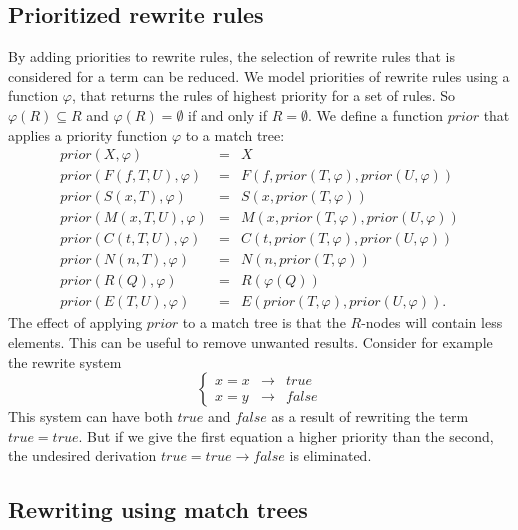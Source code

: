 \documentclass{article}
\begin{document}
\subsection{Prioritized rewrite rules}

By adding priorities to rewrite rules, the selection of rewrite rules that
is considered for a term can be reduced. We model priorities of rewrite
rules using a function $\varphi $, that returns the rules of highest
priority for a set of rules. So $\varphi (R)\subseteq R$ and $\varphi
(R)=\emptyset $ if and only if $R=\emptyset $. We define a function $prior$
that applies a priority function $\varphi $ to a match tree:%
\begin{equation*}
\begin{array}{lll}
prior(X,\varphi ) & = & X \\ 
prior(F(f,T,U),\varphi ) & = & F(f,prior(T,\varphi ),prior(U,\varphi )) \\ 
prior(S(x,T),\varphi ) & = & S(x,prior(T,\varphi )) \\ 
prior(M(x,T,U),\varphi ) & = & M(x,prior(T,\varphi ),prior(U,\varphi )) \\ 
prior(C(t,T,U),\varphi ) & = & C(t,prior(T,\varphi ),prior(U,\varphi )) \\ 
prior(N(n,T),\varphi ) & = & N(n,prior(T,\varphi )) \\ 
prior(R(Q),\varphi ) & = & R(\varphi (Q)) \\ 
prior(E(T,U),\varphi ) & = & E(prior(T,\varphi ),prior(U,\varphi )).%
\end{array}%
\end{equation*}%
The effect of applying $prior$ to a match tree is that the $R$-nodes will
contain less elements. This can be useful to remove unwanted results.
Consider for example the rewrite system%
\begin{equation*}
\left\{ 
\begin{array}{ccc}
x=x & \rightarrow & true \\ 
x=y & \rightarrow & false%
\end{array}%
\right.
\end{equation*}%
This system can have both $true$ and $false$ as a result of rewriting the
term $true=true$. But if we give the first equation a higher priority than
the second, the undesired derivation $true=true\rightarrow false$ is
eliminated.

\subsection{Rewriting using match trees}
\end{document}
